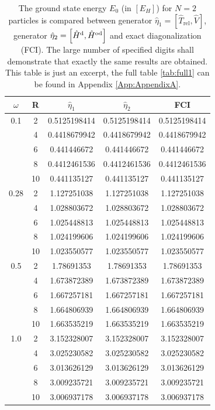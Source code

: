 \begin{table}
\begin{center}
\begin{tabular}{|c|c|c|c|c|}
\hline\hline
$\omega$ &R & $\hat{\eta}_1$ & $\hat{\eta}_2$ & FCI \\
\hline
  0.1    & 2 &  0.5125198414    & 0.5125198414   & 0.5125198414             \\
         & 4 & 0.4418679942     &  0.4418679942   & 0.4418679942         \\
         & 6 & 0.441446672      & 0.441446672    & 0.441446672           \\
         & 8 & 0.4412461536    & 0.4412461536    & 0.4412461536             \\
         & 10& 0.441135127     &0.441135127     & 0.441135127               \\ 
\hline    
  0.28   & 2 &  1.127251038    & 1.127251038   & 1.127251038        \\
         & 4 & 1.028803672     & 1.028803672   & 1.028803672            \\
         & 6 & 1.025448813     & 1.025448813   & 1.025448813          \\
         & 8 & 1.024199606    & 1.024199606      & 1.024199606          \\
         & 10& 1.023550577    & 1.023550577    & 1.023550577           \\  
\hline 
  0.5   & 2 & 1.78691353      & 1.78691353   &  1.78691353          \\
        & 4 & 1.673872389    & 1.673872389    & 1.673872389         \\
        & 6 & 1.667257181    & 1.667257181    & 1.667257181        \\
        & 8 & 1.664806939    & 1.664806939    & 1.664806939        \\
        & 10& 1.663535219    & 1.663535219       & 1.663535219          \\ 
\hline   
  1.0    & 2 & 3.152328007    & 3.152328007    & 3.152328007      \\
         & 4 &  3.025230582   & 3.025230582    & 3.025230582          \\
         & 6 & 3.013626129    & 3.013626129    & 3.013626129           \\
         & 8 & 3.009235721 & 3.009235721 & 3.009235721           \\
         & 10& 3.006937178   & 3.006937178     & 3.006937178      \\    
 \hline\hline
 \end{tabular}
\end{center}
\caption{The ground state energy $E_0$ (in $\left[E_H\right]$) for $N=2$ particles is compared between generator $\hat{\eta}_1 = \left[ \hat{T}_{\text{rel}}, \hat{V}\right]$, generator  $\hat{\eta}_2 = \left[ \hat{H}^{\rm d}, \hat{H}^{\rm od} \right]$ and exact diagonalization (FCI). The large number of specified digits shall demonstrate that exactly the same results are obtained. This table is just an excerpt, the full table \ref{tab:full1} can be found in Appendix \ref{App:AppendixA}.}
\label{tab:free1}
\end{table}


